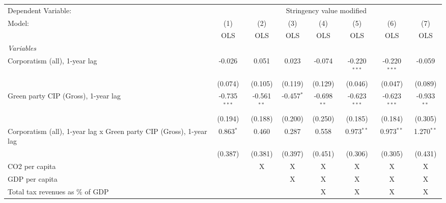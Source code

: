 
\begingroup
\centering
\begin{tabular}{lccccccc}
   \toprule
   Dependent Variable: & \multicolumn{7}{c}{Stringency value modified}\\
   Model:                                                              & (1)            & (2)           & (3)          & (4)           & (5)            & (6)            & (7)\\  
                                                                       &  OLS           & OLS           & OLS          & OLS           & OLS            & OLS            & OLS\\  
   \midrule
   \emph{Variables}\\
   Corporatism (all), 1-year lag                                       & -0.026         & 0.051         & 0.023        & -0.074        & -0.220$^{***}$ & -0.220$^{***}$ & -0.059\\   
                                                                       & (0.074)        & (0.105)       & (0.119)      & (0.129)       & (0.046)        & (0.047)        & (0.089)\\   
   Green party CIP (Gross), 1-year lag                                 & -0.735$^{***}$ & -0.561$^{**}$ & -0.457$^{*}$ & -0.698$^{**}$ & -0.623$^{***}$ & -0.623$^{***}$ & -0.933$^{**}$\\   
                                                                       & (0.194)        & (0.188)       & (0.200)      & (0.250)       & (0.185)        & (0.184)        & (0.305)\\   
   Corporatism (all), 1-year lag x Green party CIP (Gross), 1-year lag & 0.863$^{*}$    & 0.460         & 0.287        & 0.558         & 0.973$^{**}$   & 0.973$^{**}$   & 1.270$^{**}$\\   
                                                                       & (0.387)        & (0.381)       & (0.397)      & (0.451)       & (0.306)        & (0.305)        & (0.431)\\   
   CO2 per capita                                                      &                & X             & X            & X             & X              & X              & X\\  
   GDP per capita                                                      &                &               & X            & X             & X              & X              & X\\  
   Total tax revenues as \% of GDP                                     &                &               &              & X             & X              & X              & X\\  

\end{tabular}
